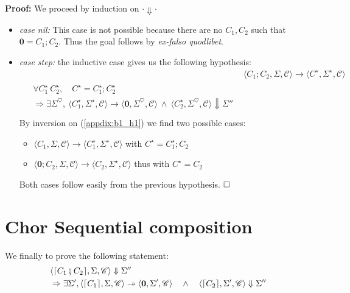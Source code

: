 \documentclass[12pt,a4paper,twoside]{book}
\newcommand{\qed}{\hfill\square}
\newcommand{\heart}{\heartsuit}
\begin{document}
\begin{appendices}
\noindent\textbf{Proof:}
We proceed by induction on $\cdot \Downarrow \cdot$
\begin{itemize}
\item \emph{case nil:} This case is not possible because there are no $C_1, C_2$ such that $\boldsymbol{0} = C_1; C_2$. Thus the goal follows by \emph{ex-falso quodlibet}.
\item \emph{case step:} the inductive case gives us the following hypothesis:
\begin{align}
&\langle C_1; C_2, \Sigma, \mathscr{C}\rangle \rightarrow
\langle C^\star, \Sigma^\star, \mathscr{C}\rangle \label{appdix:b1_h1} \tag{H1}\\
\begin{split}
&\forall C_1^\star~C_2^\star,\quad C^\star = C_1^\star; C_2^\star \\
&\Rightarrow \exists \Sigma^\heart,~\langle C_1^\star, \Sigma^\star, \mathscr{C}\rangle \rightarrow \langle \boldsymbol{0}, \Sigma^\heart, \mathscr{C}\rangle ~\land~ \langle C_2^\star, \Sigma^\heart, \mathscr{C}\rangle \Downarrow \Sigma'' \\
\end{split}\label{appdix:b1_ih}\tag{IH}
\end{align}
By inversion on (\ref{appdix:b1_h1}) we find two possible cases:
\begin{itemize}
\item $\langle C_1, \Sigma, \mathscr{C}\rangle \rightarrow
\langle C_1^\star, \Sigma^\star, \mathscr{C}\rangle$ with $C^\star = C_1^\star; C_2$
\item $\langle \boldsymbol{0}; C_2, \Sigma, \mathscr{C}\rangle \rightarrow
\langle C_2, \Sigma^\star, \mathscr{C}\rangle$ thus with $C^\star = C_2$
\end{itemize}
Both cases follow easily from the previous hypothesis. $\qed$
\end{itemize}


\section{\textbf{Chor} Sequential composition}
We finally to prove the following statement:
\begin{align}
\begin{split}
\label{appdix:Bfat}
&\langle \lceil C_1 \fatsemi C_2\rceil, \Sigma, \mathscr{C}\rangle \Downarrow \Sigma''\\
&\Rightarrow \exists \Sigma',
\langle \lceil C_1 \rceil, \Sigma, \mathscr{C} \rangle \twoheadrightarrow \langle \boldsymbol{0}, \Sigma', \mathscr{C} \rangle 
\quad\land\quad
\langle \lceil C_2 \rceil, \Sigma', \mathscr{C} \rangle \Downarrow \Sigma''
\end{split}
\end{align}


\end{appendices}
\end{document}
